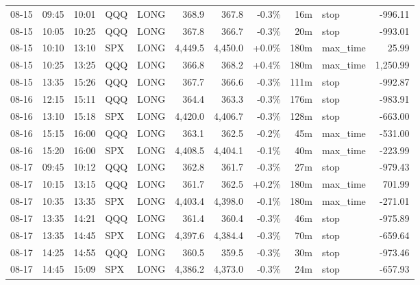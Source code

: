 \documentclass[11pt,a4paper,twoside]{article}
\begin{document}
\begin{center}
\begin{longtable}{>{\color{txtmain}}l l l l l r r r r >{\color{txtmain}}l r}
08-15 & 09:45 & 10:01 & QQQ & LONG & 368.9 & 367.8 & \textcolor{lossred}{-0.3\%} & 16m & stop & \textcolor{lossred}{-996.11} \\
08-15 & 10:05 & 10:25 & QQQ & LONG & 367.8 & 366.7 & \textcolor{lossred}{-0.3\%} & 20m & stop & \textcolor{lossred}{-993.01} \\
08-15 & 10:10 & 13:10 & SPX & LONG & 4,449.5 & 4,450.0 & \textcolor{wingreen}{+0.0\%} & 180m & max\_time & \textcolor{wingreen}{25.99} \\
08-15 & 10:25 & 13:25 & QQQ & LONG & 366.8 & 368.2 & \textcolor{wingreen}{+0.4\%} & 180m & max\_time & \textcolor{wingreen}{1,250.99} \\
08-15 & 13:35 & 15:26 & QQQ & LONG & 367.7 & 366.6 & \textcolor{lossred}{-0.3\%} & 111m & stop & \textcolor{lossred}{-992.87} \\
08-16 & 12:15 & 15:11 & QQQ & LONG & 364.4 & 363.3 & \textcolor{lossred}{-0.3\%} & 176m & stop & \textcolor{lossred}{-983.91} \\
08-16 & 13:10 & 15:18 & SPX & LONG & 4,420.0 & 4,406.7 & \textcolor{lossred}{-0.3\%} & 128m & stop & \textcolor{lossred}{-663.00} \\
08-16 & 15:15 & 16:00 & QQQ & LONG & 363.1 & 362.5 & \textcolor{lossred}{-0.2\%} & 45m & max\_time & \textcolor{lossred}{-531.00} \\
08-16 & 15:20 & 16:00 & SPX & LONG & 4,408.5 & 4,404.1 & \textcolor{lossred}{-0.1\%} & 40m & max\_time & \textcolor{lossred}{-223.99} \\
08-17 & 09:45 & 10:12 & QQQ & LONG & 362.8 & 361.7 & \textcolor{lossred}{-0.3\%} & 27m & stop & \textcolor{lossred}{-979.43} \\
08-17 & 10:15 & 13:15 & QQQ & LONG & 361.7 & 362.5 & \textcolor{wingreen}{+0.2\%} & 180m & max\_time & \textcolor{wingreen}{701.99} \\
08-17 & 10:35 & 13:35 & SPX & LONG & 4,403.4 & 4,398.0 & \textcolor{lossred}{-0.1\%} & 180m & max\_time & \textcolor{lossred}{-271.01} \\
08-17 & 13:35 & 14:21 & QQQ & LONG & 361.4 & 360.4 & \textcolor{lossred}{-0.3\%} & 46m & stop & \textcolor{lossred}{-975.89} \\
08-17 & 13:35 & 14:45 & SPX & LONG & 4,397.6 & 4,384.4 & \textcolor{lossred}{-0.3\%} & 70m & stop & \textcolor{lossred}{-659.64} \\
08-17 & 14:25 & 14:55 & QQQ & LONG & 360.5 & 359.5 & \textcolor{lossred}{-0.3\%} & 30m & stop & \textcolor{lossred}{-973.46} \\
08-17 & 14:45 & 15:09 & SPX & LONG & 4,386.2 & 4,373.0 & \textcolor{lossred}{-0.3\%} & 24m & stop & \textcolor{lossred}{-657.93} \\

\end{longtable}
\end{center}
\end{document}

